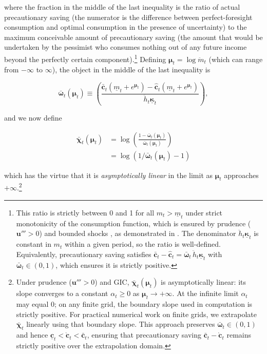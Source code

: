 \documentclass[twocolumn, switch]{article}
\newcommand{\uFunc}{\mathbf{u}}
\newcommand{\mNrm}{m}
\newcommand{\cFunc}{\mathbf{c}}
\newcommand{\cFuncOpt}{\bar{\cFunc}}
\newcommand{\cFuncApprox}{\grave{\cFunc}}
\newcommand{\hNrm}{h}
\newcommand{\MPC}{\boldsymbol{\kappa}}
\newcommand{\MPCmin}{\underline{\MPC}}
\newcommand{\mNrmMin}{\underline{\mNrm}}
\newcommand{\mNrmEx}{\ddot{\mNrm}}
\newcommand{\hNrmEx}{\ddot{\hNrm}}
\newcommand{\cFuncPes}{\underline{\cFunc}}
\newcommand{\cFuncReal}{\hat{\cFunc}}
\newcommand{\modRte}{\boldsymbol{\bar{\omega}}}
\newcommand{\logmNrmEx}{\boldsymbol{\mu}}
\newcommand{\logitModRte}{\boldsymbol{\chi}}
\newcommand{\logitModRteFunc}{\bar{\logitModRte}}
\begin{document}
where the fraction in the middle of the last inequality is the ratio of actual
precautionary saving (the numerator is the difference between perfect-foresight
consumption and optimal consumption in the presence of uncertainty) to the
maximum conceivable amount of precautionary saving (the amount that would be
undertaken by the pessimist who consumes nothing out of any future income beyond
the perfectly certain component).\footnote{This ratio is strictly between 0 and 1 for all $\mNrm_{t} > \mNrmMin_{t}$ under strict
monotonicity of the consumption function, which is ensured by prudence ($\uFunc''' > 0$)
and bounded shocks \citep{CarrollKimball1996}, as demonstrated in \citet{CarrollShanker2024}. The denominator
$\hNrmEx_{t} \MPCmin_{t}$ is constant in $\mNrm_{t}$ within a given period, so the ratio is
well-defined. Equivalently, precautionary saving satisfies
$\cFuncOpt_{t} -\cFuncReal_{t} = \modRte_{t}\,\hNrmEx_{t} \MPCmin_{t}$ with $\modRte_{t}\in(0,1)$,
which ensures it is strictly positive.} Defining
$\logmNrmEx_{t} = \log \mNrmEx_{t}$ (which can range from $-\infty$ to
$\infty$), the object in the middle of the last inequality is

\begin{equation}
\label{eq:koppa}
\modRte_{t}(\logmNrmEx_{t}) \equiv  \left(\frac{\cFuncOpt_{t}(\mNrmMin_{t}+e^{\logmNrmEx_{t}})-\cFuncReal_{t}(\mNrmMin_{t}+e^{\logmNrmEx_{t}})}{\hNrmEx_{t} \MPCmin_{t}}\right),
\end{equation}

and we now define

\begin{equation}
\label{eq:chi}
\begin{aligned}
\logitModRteFunc_{t}(\logmNrmEx_{t}) &= \log \left(\frac{1-\modRte_{t}(\logmNrmEx_{t})}{\modRte_{t}(\logmNrmEx_{t})}\right) \\
&= \log \left(1/\modRte_{t}(\logmNrmEx_{t})-1\right)
\end{aligned}
\end{equation}

which has the virtue that it is \textit{asymptotically linear} in the limit as
$\logmNrmEx_{t}$ approaches $+\infty$.\footnote{Under prudence ($\uFunc''' > 0$) and GIC, $\logitModRteFunc_{t}(\logmNrmEx_{t})$ is
asymptotically linear: its slope converges to a constant $\alpha_{t} \ge 0$ as $\logmNrmEx_{t} \to +\infty$. At the
infinite limit $\alpha_{t}$ may equal 0; on any finite grid, the boundary slope used
in computation is strictly positive. For practical numerical work on finite grids,
we extrapolate $\logitModRteFunc_{t}$ linearly using that boundary slope. This approach
preserves $\modRte_{t}\in(0,1)$ and hence $\cFuncPes_{t} < \cFuncApprox_{t} < \cFuncOpt_{t}$,
ensuring that precautionary saving $\cFuncOpt_{t} -\cFuncApprox_{t}$ remains strictly
positive over the extrapolation domain.}
\end{document}
